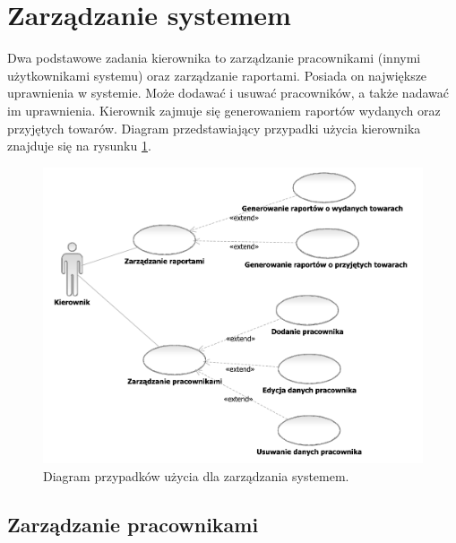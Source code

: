 \section{Zarządzanie systemem}
Dwa podstawowe zadania kierownika to zarządzanie pracownikami (innymi
użytkownikami systemu) oraz zarządzanie raportami. Posiada on
największe uprawnienia w systemie. Może dodawać i usuwać pracowników,
a także nadawać im uprawnienia. Kierownik zajmuje się generowaniem
raportów wydanych oraz przyjętych towarów.  Diagram przedstawiający
przypadki użycia kierownika znajduje się na rysunku \ref{fig:ZarzadzanieSystemem}.

\begin{figure}[H]
  \centering
  \includegraphics[scale=0.6]{../img/usecase/ZarzadzanieSystemem.pdf}
  \caption{Diagram przypadków użycia dla zarządzania systemem.}
  \label{fig:ZarzadzanieSystemem}
\end{figure}
\newpage
\singlespacing
\subsection{Zarządzanie pracownikami} 
\begin{usecase}
\end{usecase}

